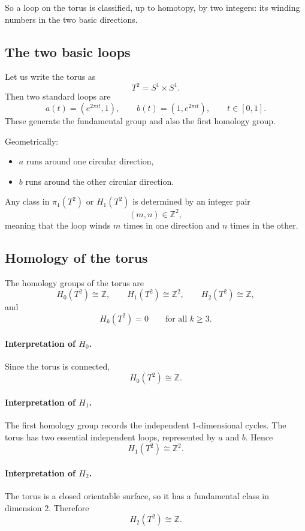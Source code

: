 \documentclass[12pt,a4paper]{article}
\theoremstyle{notespace}
\begin{document}
So a loop on the torus is classified, up to homotopy, by two integers: its winding numbers in the two basic directions.

\subsection{The two basic loops}

Let us write the torus as
\[
T^2=S^1\times S^1.
\]
Then two standard loops are
\[
a(t)=(e^{2\pi i t},1),
\qquad
b(t)=(1,e^{2\pi i t}),
\qquad t\in [0,1].
\]
These generate the fundamental group and also the first homology group.

Geometrically:

\begin{itemize}
	\item \(a\) runs around one circular direction,
	\item \(b\) runs around the other circular direction.
\end{itemize}

Any class in \(\pi_1(T^2)\) or \(H_1(T^2)\) is determined by an integer pair
\[
(m,n)\in \mathbb Z^2,
\]
meaning that the loop winds \(m\) times in one direction and \(n\) times in the other.

\subsection{Homology of the torus}

The homology groups of the torus are
\[
H_0(T^2)\cong \mathbb Z,
\qquad
H_1(T^2)\cong \mathbb Z^2,
\qquad
H_2(T^2)\cong \mathbb Z,
\]
and
\[
H_k(T^2)=0
\qquad\text{for all }k\ge 3.
\]

\paragraph{Interpretation of \(H_0\).}
Since the torus is connected,
\[
H_0(T^2)\cong \mathbb Z.
\]

\paragraph{Interpretation of \(H_1\).}
The first homology group records the independent \(1\)-dimensional cycles. The torus has two essential independent loops, represented by \(a\) and \(b\). Hence
\[
H_1(T^2)\cong \mathbb Z^2.
\]

\paragraph{Interpretation of \(H_2\).}
The torus is a closed orientable surface, so it has a fundamental class in dimension \(2\). Therefore
\[
H_2(T^2)\cong \mathbb Z.
\]
\end{document}
